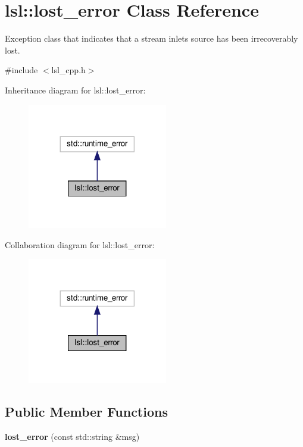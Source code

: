 \hypertarget{classlsl_1_1lost__error}{}\section{lsl\+:\+:lost\+\_\+error Class Reference}
\label{classlsl_1_1lost__error}


Exception class that indicates that a stream inlet\textquotesingle{}s source has been irrecoverably lost.  




{\ttfamily \#include $<$lsl\+\_\+cpp.\+h$>$}



Inheritance diagram for lsl\+:\+:lost\+\_\+error\+:
\nopagebreak
\begin{figure}[H]
\begin{center}
\leavevmode
\includegraphics[width=173pt]{d5/d0b/classlsl_1_1lost__error__inherit__graph}
\end{center}
\end{figure}


Collaboration diagram for lsl\+:\+:lost\+\_\+error\+:
\nopagebreak
\begin{figure}[H]
\begin{center}
\leavevmode
\includegraphics[width=173pt]{d7/d36/classlsl_1_1lost__error__coll__graph}
\end{center}
\end{figure}
\subsection*{Public Member Functions}
\begin{DoxyCompactItemize}
\item 
\mbox{\label{classlsl_1_1lost__error_a997ff6ff1ecd4fd33cda631b975d386e}} 
{\bfseries lost\+\_\+error} (const std\+::string \&msg)
\end{DoxyCompactItemize}


